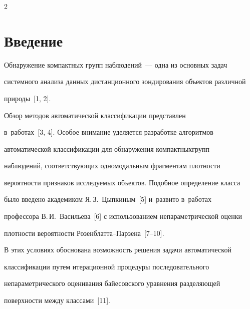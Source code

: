 \begin{multicols}{2}





\label{st\stat}


  


\section{Введение}





\vspace*{-4pt}





  Обнаружение компактных групп наблюдений~--- одна из основных задач 


системного анализа данных дистанционного зондирования объектов различной 


природы~[1, 2]. 





Обзор методов автоматической классификации представлен 


в~работах~[3, 4]. Особое внимание уделяется разработке алгоритмов 


автоматической классификации для обнаружения компактных\linebreak групп 


наблюдений, со\-от\-вет\-ст\-ву\-ющих одномодальным фрагментам плот\-ности 


ве\-ро\-ят\-ности признаков ис\-сле\-ду\-емых объектов. Подобное определение класса 


было введено академиком Я.\,З.~\mbox{Цыпкиным}~[5] и~развито в~работах 


профессора В.\,И.~Васильева~[6] с использованием непараметрической оценки 


плотности вероятности Ро\-зен\-блат\-та--Пар\-зе\-на~[7--10].


  


  В этих условиях обоснована возможность решения задачи автоматической 


классификации путем итерационной процедуры последовательного 


непараметрического оценивания байесовского уравнения разделяющей 


поверхности между классами~[11]. 






\end{multicols}
